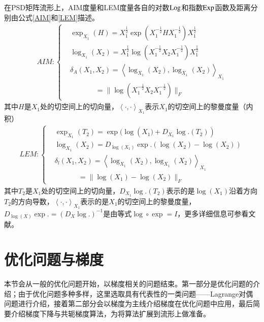 在PSD矩阵流形上，AIM度量\cite{AIM_metric}和LEM度量\cite{LEM_metric}各自的对数${\rm Log}$和指数${\rm Exp}$函数及距离分别由公式\ref{AIM}和\ref{LEM}描述。
\begin{equation}
\label{AIM}
\begin{split}
AIM:\left\{
\begin{aligned}
&\exp_{X_1}(H)=X_{1}^{\frac{1}{2}}\exp(X_{1}^{-\frac{1}{2}}HX_{1}^{-\frac{1}{2}})X_{1}^{\frac{1}{2}}\\
&\log_{{X_1}}({X_2})={X_{1}^{\frac{1}{2}}}\log({X_{1}^{-\frac{1}{2}}}{X_2}{X_{1}^{-\frac{1}{2}}}){X_{1}^{\frac{1}{2}}}\\
&\delta_{A}({X_1,X_2})=\left<\log_{{X_1}}({X_2}),\log_{{X_1}}({X_2})\right>_{{X_1}}\\
&~~~~~~~~~~~~~~~~=\|\log({X_{1}^{-\frac{1}{2}}}{X_2}{X_{1}^{-\frac{1}{2}}})\|_F
\end{aligned}
\right.
\end{split}
\end{equation}
其中${H}$是${X_1}$处的切空间上的切向量，$\left<\cdot,\cdot\right>_{{X_1}}$表示$X_1$的切空间上的黎曼度量（内积）
\begin{equation}
\label{LEM}
\begin{split}
LEM:\left\{
\begin{aligned}
&\exp_{{X_1}}({T_2})=\exp(\log({X_{1})}+D_{X_1}\log.({T_2}))\\
&\log_{{X_1}}({X_2})=D_{\log({X_1})}\exp.(\log({X_2})-\log({X_2}))\\
&\delta_{l}({X_1,X_2})=\left<\log_{{X_1}}({X_2}),\log_{{X_1}}({X_2})\right>_{{X_1}}\\
&~~~~~~~~~~~~~~~=\|\log({X_{1}})-\log({X_{2}})\|_F
\end{aligned}
\right.
\end{split}
\end{equation}
其中${T_2}$是${X_1}$处的切空间上的切向量，$D_{X_1}\log.(T_2)$表示的是$\log(X_1)$沿着方向$T_2$的方向导数，$\left<\cdot,\cdot\right>_{{X_1}}$表示的是$X_1$的切空间上的黎曼度量，$D_{\log({X})}\exp.=(D_{{X}}\log.)^{-1}$是由等式$\log \circ \exp={I}$，更多详细信息可参看文献\cite{LEM_metric}。
\section{优化问题与梯度}
\label{sec:opt_and_gradient}
本节会从一般的优化问题开始，以梯度相关的问题结束。第一部分是优化问题的介绍；由于优化问题多种多样，这里选取具有代表性的一类问题——Lagrange对偶问题进行介绍，接着第二部分会以梯度为主线介绍梯度在优化问题中应用，最后简要介绍梯度下降与共轭梯度算法，为将算法扩展到流形上做准备。
